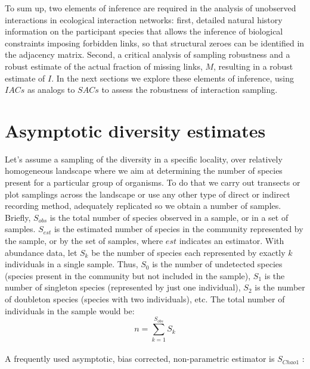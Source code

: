\documentclass[12pt]{article}
\begin{document}

To sum up, two elements of inference are required in the analysis of unobserved interactions in ecological interaction networks: first, detailed natural history information on the participant species that allows the inference of biological constraints imposing forbidden links, so that structural zeroes can be identified in the adjacency matrix. Second, a critical analysis of sampling robustness and a robust estimate of the actual fraction of missing links, $M$, resulting in a robust estimate of $I$. In the next sections we explore these elements of inference, using $IACs$ as analogs to $SACs$ to assess the robustness of interaction sampling.

\section*{Asymptotic diversity estimates}
\label{asymptoticdiversityestimates}

Let's assume a sampling of the diversity in a specific locality, over relatively homogeneous landscape where we aim at determining the number of species present for a particular group of organisms. To do that we carry out transects or plot samplings across the landscape or use any other type of direct or indirect recording method, adequately replicated so we obtain a number of samples. Briefly, $S_{obs}$ is the total number of species observed in a sample, or in a set of samples. $S_{est}$ is the estimated number of species in the community represented by the sample, or by the set of samples, where $est$ indicates an estimator. With abundance data, let $S_k$ be the number of species each represented by exactly $k$ individuals in a single sample. Thus, $S_0$ is the number of undetected species (species present in the community but not included in the sample), $S_1$ is the number of singleton species (represented by just one individual), $S_2$ is the number of doubleton species (species with two individuals), etc. The total number of individuals in the sample would be:\\  

$$n = \sum_{k=1}^{S_{obs}}S_k$$\\
A frequently used asymptotic, bias corrected, non-parametric estimator is $S_{Chao1}$ \citep{Hortal:2006dc,Chao:2005wp,Colwell:2013kj}: 
\end{document}
